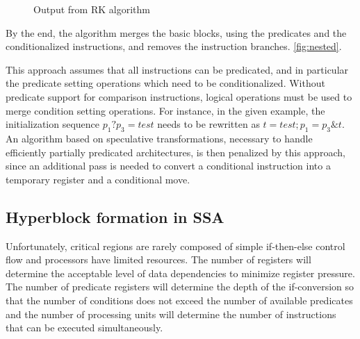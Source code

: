 \begin{figure}
\footnotesize
\caption{Output from RK algorithm}
\label{fig:RK}
\end{figure}

By the end, the algorithm merges the basic blocks, using the predicates and the conditionalized instructions, and removes the instruction branches. \ref{fig:nested}. 

This approach assumes that all instructions can be predicated, and in particular the predicate setting operations which need to be conditionalized. Without predicate support for comparison instructions, logical operations must be used to merge condition setting operations. For instance, in the given example, the initialization sequence $p_1 ? p_3=test$ needs to be rewritten as $t=test; p_1=p_3 \& t$. An algorithm based on speculative transformations, necessary to handle efficiently partially predicated architectures, is then penalized by this approach, since an additional pass is needed to convert a conditional instruction into a temporary register and a conditional move.

\subsection{Hyperblock formation in SSA}

Unfortunately, critical regions are rarely composed of simple if-then-else control flow and processors have limited resources. The number of registers will determine the acceptable level of data dependencies to minimize register pressure. The number of predicate registers will determine the depth of the if-conversion so that the number of conditions does not exceed the number of available predicates and the number of processing units will determine the number of instructions that can be executed simultaneously. 

